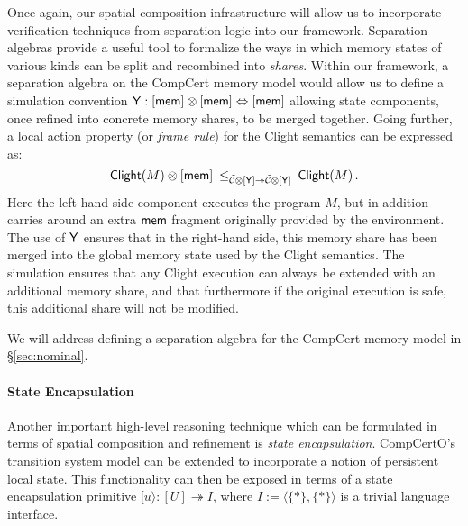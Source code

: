 Once again,
our spatial composition infrastructure
will allow us to incorporate
verification techniques from separation logic into our framework.
Separation algebras \cite{sepalg}
provide a useful tool to formalize the ways in which
memory states of various kinds can be
split and recombined into \emph{shares}.
Within our framework,
a separation algebra on the CompCert memory model
would allow us to define
a simulation convention
$ \mathsf{Y}  : [ \mathsf{mem} ] \otimes [ \mathsf{mem} ] \Leftrightarrow [ \mathsf{mem} ]$
allowing state components,
once refined into concrete memory shares,
to be merged together.
Going further,
a local action property (or \emph{frame rule})
for the Clight semantics can be expressed as:
\[
   \mathsf{Clight} (M) \otimes [ \mathsf{mem} ]
  \:
  \le_{\mathcal{\tilde{C}} \otimes [ \mathsf{Y} ] \twoheadrightarrow
       \mathcal{\tilde{C}} \otimes [ \mathsf{Y} ]}
  \:
   \mathsf{Clight} (M)
  \,.
\]
Here the left-hand side component executes the program $M$,
but in addition carries around an extra $ \mathsf{mem} $ fragment
originally provided by the environment.
The use of $ \mathsf{Y} $ ensures that in the right-hand side,
this memory share has been merged into the global memory state
used by the Clight semantics.
The simulation ensures that
any Clight execution can always be extended with an additional memory share,
and that furthermore if the original execution is safe,
this additional share will not be modified.

We will address defining a separation algebra
for the CompCert memory model in \S\ref{sec:nominal}.

\paragraph{State Encapsulation}

Another important high-level reasoning technique
which can be formulated in terms of spatial composition and refinement
is \emph{state encapsulation}.
CompCertO's transition system model can be extended
to incorporate a notion of persistent local state.
This functionality can then be exposed in terms of
a state encapsulation primitive $[ u \rangle : [U] \twoheadrightarrow I$,
where $I := \langle \{*\}, \{*\} \rangle$ is a trivial language interface.

